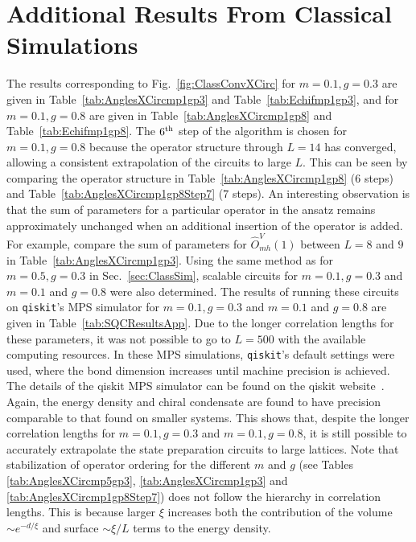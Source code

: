 \documentclass[aps, pra, onecolumn, tightenlines, letterpaper, amsmath, amssymb, preprintnumbers, floatfix, longbibliography, nofootinbib]{revtex4-2}
\begin{document}
\section{Additional Results From Classical Simulations}
\label{app:classData}
%
\noindent
The results corresponding to Fig.~\ref{fig:ClassConvXCirc} for $m=0.1,g=0.3$ are given in Table~\ref{tab:AnglesXCircmp1gp3} and Table~\ref{tab:Echifmp1gp3}, and for
$m=0.1,g=0.8$ are given in Table~\ref{tab:AnglesXCircmp1gp8} and Table~\ref{tab:Echifmp1gp8}.
The $6^{\rm th}$ step of the algorithm is chosen for $m=0.1, g=0.8$ because the operator structure through $L=14$ has converged, allowing a consistent extrapolation of the circuits to large $L$.
This can be seen by comparing the operator structure in Table~\ref{tab:AnglesXCircmp1gp8} (6 steps) and Table~\ref{tab:AnglesXCircmp1gp8Step7} (7 steps). An interesting observation is that the sum of parameters for a particular operator in the ansatz remains approximately unchanged when an additional insertion of the operator is added. 
For example, compare the sum of parameters for $\hat{O}^V_{mh}(1)$ between $L=8$ and $9$ in Table~\ref{tab:AnglesXCircmp1gp3}.
Using the same method as for $m=0.5, g=0.3$ in Sec.~\ref{sec:ClassSim}, scalable circuits for $m=0.1, g=0.3$ and $m=0.1$ and $g=0.8$ were also determined.
The results of running these circuits on {\tt qiskit}'s MPS simulator for $m=0.1, g=0.3$ and $m=0.1$ and $g=0.8$ are given in Table~\ref{tab:SQCResultsApp}.
Due to the longer correlation lengths for these parameters, it was not possible to go to $L=500$ with the available computing resources.
In these MPS simulations, {\tt qiskit}'s default settings were used, where the bond dimension increases until machine precision is achieved.
The details of the qiskit MPS simulator can be found on the qiskit website~\cite{qiskitMPS}.
Again, the energy density and chiral condensate are found to have precision comparable to 
that found on smaller systems.
This shows that, despite the longer correlation lengths for $m=0.1, g=0.3$ and $m=0.1,g=0.8$, it is still possible to accurately extrapolate the state preparation circuits to large lattices. 
Note that stabilization of operator ordering for the different $m$ and $g$ (see Tables \ref{tab:AnglesXCircmp5gp3}, \ref{tab:AnglesXCircmp1gp3} and \ref{tab:AnglesXCircmp1gp8Step7}) does not follow the hierarchy in correlation lengths. 
This is because larger $\xi$ increases both the contribution of the volume $\sim e^{-d/\xi}$ and surface $\sim \xi/L$ terms to the energy density.
\end{document}
